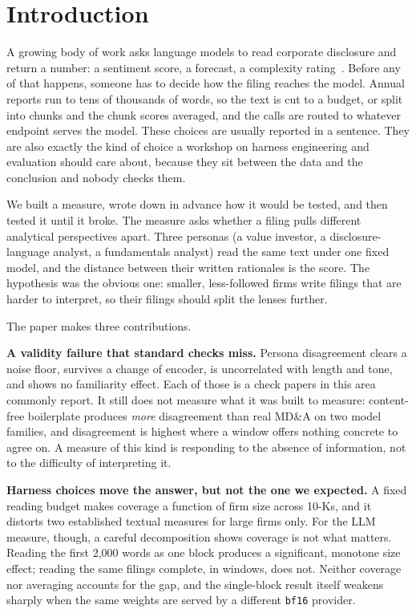 \documentclass[sigconf,nonacm]{acmart}
\begin{document}
\maketitle

\section{Introduction}

A growing body of work asks language models to read corporate disclosure and return a
number: a sentiment score, a forecast, a complexity rating~\cite{kmn2023, ll2023}.
Before any of that happens, someone has to decide how the filing reaches the model.
Annual reports run to tens of thousands of words, so the text is cut to a budget, or
split into chunks and the chunk scores averaged, and the calls are routed to whatever
endpoint serves the model. These choices are usually reported in a sentence. They are
also exactly the kind of choice a workshop on harness engineering and evaluation should
care about, because they sit between the data and the conclusion and nobody checks them.

We built a measure, wrote down in advance how it would be tested, and then tested it
until it broke. The measure asks whether a filing pulls different analytical
perspectives apart. Three personas (a value investor, a disclosure-language analyst, a
fundamentals analyst) read the same text under one fixed model, and the distance
between their written rationales is the score. The hypothesis was the obvious one:
smaller, less-followed firms write filings that are harder to interpret, so their
filings should split the lenses further.

The paper makes three contributions.

\textbf{A validity failure that standard checks miss.} Persona disagreement clears a
noise floor, survives a change of encoder, is uncorrelated with length and tone, and
shows no familiarity effect. Each of those is a check papers in this area commonly
report. It still does not measure what it was built to measure: content-free
boilerplate produces \emph{more} disagreement than real MD\&A on two model families,
and disagreement is highest where a window offers nothing concrete to agree on. A
measure of this kind is responding to the absence of information, not to the difficulty
of interpreting it.

\textbf{Harness choices move the answer, but not the one we expected.} A fixed reading
budget makes coverage a function of firm size across \ScaleNUsable{} 10-Ks, and it
distorts two established textual measures for large firms only. For the LLM measure,
though, a careful decomposition shows coverage is not what matters. Reading the first
2,000 words as one block produces a significant, monotone size effect; reading the same
filings complete, in windows, does not. Neither coverage nor averaging accounts for the
gap, and the single-block result itself weakens sharply when the same weights are
served by a different \texttt{bf16} provider.
\end{document}
